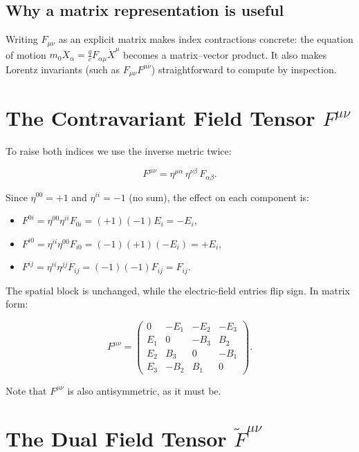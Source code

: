 \subsection*{Why a matrix representation is useful}

Writing $F_{\mu\nu}$ as an explicit matrix makes index contractions concrete: the equation of motion $m_0\ddot{X}_\alpha = \frac{q}{c}F_{\alpha\mu}\dot{X}^\mu$ becomes a matrix--vector product. It also makes Lorentz invariants (such as $F_{\mu\nu}F^{\mu\nu}$) straightforward to compute by inspection.

\section{The Contravariant Field Tensor $F^{\mu\nu}$}

To raise both indices we use the inverse metric twice:

\begin{equation}
F^{\mu\nu} = \eta^{\mu\alpha}\,\eta^{\nu\beta}\,F_{\alpha\beta}.
\end{equation}

Since $\eta^{00} = +1$ and $\eta^{ii} = -1$ (no sum), the effect on each component is:
\begin{itemize}
\item $F^{0i} = \eta^{00}\eta^{ii}F_{0i} = (+1)(-1)E_i = -E_i$,
\item $F^{i0} = \eta^{ii}\eta^{00}F_{i0} = (-1)(+1)(-E_i) = +E_i$,
\item $F^{ij} = \eta^{ii}\eta^{jj}F_{ij} = (-1)(-1)F_{ij} = F_{ij}$.
\end{itemize}

The spatial block is unchanged, while the electric-field entries flip sign. In matrix form:

\begin{equation}
\boxed{
F^{\mu\nu} = \begin{pmatrix}
0 & -E_1 & -E_2 & -E_3 \\
E_1 & 0 & -B_3 & B_2 \\
E_2 & B_3 & 0 & -B_1 \\
E_3 & -B_2 & B_1 & 0
\end{pmatrix}.}
\end{equation}

Note that $F^{\mu\nu}$ is also antisymmetric, as it must be.

\section{The Dual Field Tensor $\widetilde{F}^{\mu\nu}$}


